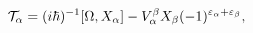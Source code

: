 \begin{equation}
{\cal T}_{\alpha}=(i\hbar)^{-1}[\Omega,X_{\alpha}]-V_{\alpha}^{\beta
}X_{\beta}(-1)^{\varepsilon_{\alpha}+\varepsilon_{\beta}},\label{3.3}%
\end{equation}

